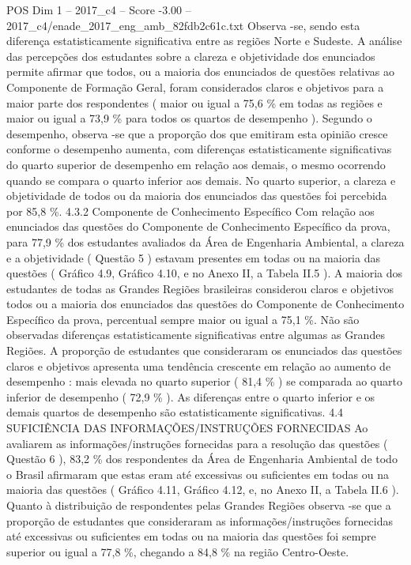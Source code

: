 \begin{textsample}{POS Dim 1 – 2017\_c4 – Score -3.00 – 2017\_c4/enade\_2017\_eng\_amb\_82fdb2c61c.txt}
Observa -se, sendo esta diferença estatisticamente significativa entre as regiões Norte e Sudeste.
A análise das percepções dos estudantes sobre a clareza e objetividade dos enunciados permite afirmar que todos, ou a maioria dos enunciados de questões relativas ao Componente de Formação Geral, foram considerados claros e objetivos para a maior parte dos respondentes ( maior ou igual a 75,6 \% em todas as regiões e maior ou igual a 73,9 \% para todos os quartos de desempenho ).
Segundo o desempenho, observa -se que a proporção dos que emitiram esta opinião cresce conforme o desempenho aumenta, com diferenças estatisticamente significativas do quarto superior de desempenho em relação aos demais, o mesmo ocorrendo quando se compara o quarto inferior aos demais.
No quarto superior, a clareza e objetividade de todos ou da maioria dos enunciados das questões foi percebida por 85,8 \%. 4.3.2 Componente de Conhecimento Específico Com relação aos enunciados das questões do Componente de Conhecimento Específico da prova, para 77,9 \% dos estudantes avaliados da Área de Engenharia Ambiental, a clareza e a objetividade ( Questão 5 ) estavam presentes em todas ou na maioria das questões ( Gráfico 4.9, Gráfico 4.10, e no Anexo II, a Tabela II.5 ).
A maioria dos estudantes de todas as Grandes Regiões brasileiras considerou claros e objetivos todos ou a maioria dos enunciados das questões do Componente de Conhecimento Específico da prova, percentual sempre maior ou igual a 75,1 \%.
Não são observadas diferenças estatisticamente significativas entre algumas as Grandes Regiões.
A proporção de estudantes que consideraram os enunciados das questões claros e objetivos apresenta uma tendência crescente em relação ao aumento de desempenho : mais elevada no quarto superior ( 81,4 \% ) se comparada ao quarto inferior de desempenho ( 72,9 \% ).
As diferenças entre o quarto inferior e os demais quartos de desempenho são estatisticamente significativas. 4.4 SUFICIÊNCIA DAS INFORMAÇÕES/INSTRUÇÕES FORNECIDAS Ao avaliarem as informações/instruções fornecidas para a resolução das questões ( Questão 6 ), 83,2 \% dos respondentes da Área de Engenharia Ambiental de todo o Brasil afirmaram que estas eram até excessivas ou suficientes em todas ou na maioria das questões ( Gráfico 4.11, Gráfico 4.12, e, no Anexo II, a Tabela II.6 ).
Quanto à distribuição de respondentes pelas Grandes Regiões observa -se que a proporção de estudantes que consideraram as informações/instruções fornecidas até excessivas ou suficientes em todas ou na maioria das questões foi sempre superior ou igual a 77,8 \%, chegando a 84,8 \% na região Centro-Oeste.

\end{textsample}
